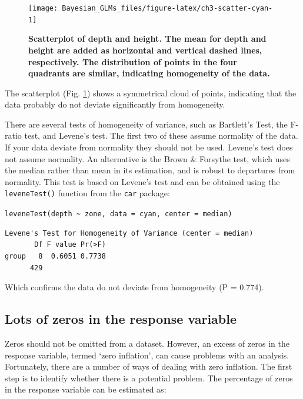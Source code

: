 \documentclass[
]{book}
\begin{document}
\begin{figure}

{\centering \texttt{[image: Bayesian\_GLMs\_files/figure-latex/ch3-scatter-cyan-1]} 

}

\caption{\textbf{Scatterplot of depth and height. The mean for depth and height are added as horizontal and vertical dashed lines, respectively. The distribution of points in the four quadrants are similar, indicating homogeneity of the data.}}\label{fig:ch3-scatter-cyan}
\end{figure}

The scatterplot (Fig. \ref{fig:ch3-scatter-cyan}) shows a symmetrical cloud of points, indicating that the data probably do not deviate significantly from homogeneity.

There are several tests of homogeneity of variance, such as Bartlett's Test, the F-ratio test, and Levene's test. The first two of these assume normality of the data. If your data deviate from normality they should not be used. Levene's test does not assume normality. An alternative is the Brown \& Forsythe test, which uses the median rather than mean in its estimation, and is robust to departures from normality. This test is based on Levene's test and can be obtained using the \texttt{leveneTest()} function from the \texttt{car} package:

\texttt{leveneTest(depth\ \textasciitilde{}\ zone,\ data\ =\ cyan,\ center\ =\ median)}

\begin{verbatim}
Levene's Test for Homogeneity of Variance (center = median)
       Df F value Pr(>F)
group   8  0.6051 0.7738
      429               
\end{verbatim}

Which confirms the data do not deviate from homogeneity (P = 0.774).

\hypertarget{lots-of-zeros-in-the-response-variable}{%
\subsection{Lots of zeros in the response variable}\label{lots-of-zeros-in-the-response-variable}}

Zeros should not be omitted from a dataset. However, an excess of zeros in the response variable, termed `zero inflation', can cause problems with an analysis. Fortunately, there are a number of ways of dealing with zero inflation. The first step is to identify whether there is a potential problem. The percentage of zeros in the response variable can be estimated as:
\end{document}
